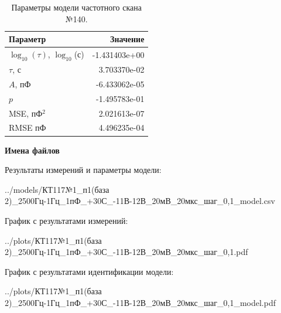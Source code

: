 \begin{table}[!ht]
    \centering
    \caption{Параметры модели частотного скана №140.}
    \begin{tabular}{|l|r|}
        \hline
        Параметр                                       & Значение                  \\ \hline
        $\log_{10}(\tau)$, $\log_{10}$(с)              & -1.431403e+00             \\ \hline
        $\tau$, с                                      & 3.703370e-02              \\ \hline
        $A$, пФ                                        & -6.433062e-05             \\ \hline
        $p$                                            & -1.495783e-01             \\ \hline
        MSE, пФ$^2$                                    & 2.021613e-07              \\ \hline
        RMSE пФ                                        & 4.496235e-04              \\ \hline
    \end{tabular}
    \label{table:frequency_scan_model_140}
\end{table}

\textbf{Имена файлов}

Результаты измерений и параметры модели:

\scriptsize../models/КТ117№1\_п1(база 2)\_2500Гц-1Гц\_1пФ\_+30С\_-11В-12В\_20мВ\_20мкс\_шаг\_0,1\_model.csv
\normalsize

График с результатами измерений:

\scriptsize../plots/КТ117№1\_п1(база 2)\_2500Гц-1Гц\_1пФ\_+30С\_-11В-12В\_20мВ\_20мкс\_шаг\_0,1.pdf
\normalsize

График с результатами идентификации модели:

\scriptsize../plots/КТ117№1\_п1(база 2)\_2500Гц-1Гц\_1пФ\_+30С\_-11В-12В\_20мВ\_20мкс\_шаг\_0,1\_model.pdf
\normalsize


